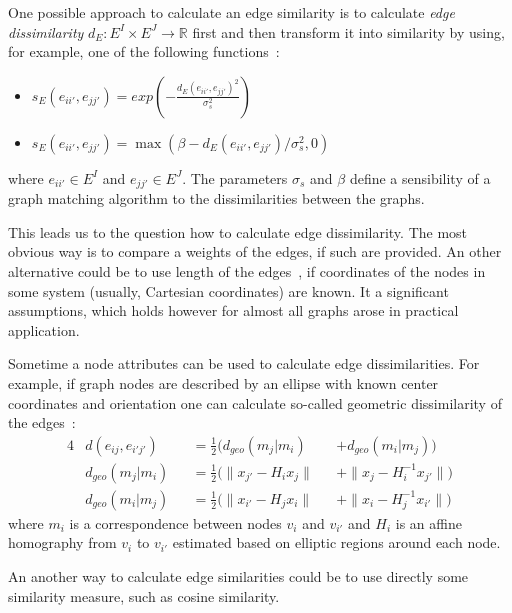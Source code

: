 One possible approach to calculate an edge similarity is to calculate \emph{edge dissimilarity} $d_E:E^I\times E^J\rightarrow\mathbb{R}$ first and then transform it into similarity by using, for example, one of the following functions~\cite{Cho2014_Haystack, Cho2009_AgglClustering, Cho2010_RRWM,Cho2012_ProgressiveGM}:
\begin{itemize}
	\item $s_E(e_{ii\prime}, e_{jj\prime})= exp(-\frac{d_E(e_{ii\prime}, e_{jj\prime})^2}{\sigma^2_{s}})$
	\item $s_E(e_{ii\prime}, e_{jj\prime})= \max(\beta - d_E(e_{ii\prime}, e_{jj\prime})/\sigma^2_{s},0)$
\end{itemize}
where $e_{ii\prime}\in E^I$ and $e_{jj\prime}\in E^J$. The parameters $\sigma_s$ and $\beta$ define a sensibility of a graph matching algorithm to the dissimilarities between the graphs.

This leads us to the question how to calculate edge dissimilarity. The most obvious way is to compare a weights of the edges, if such are provided. An other alternative could be to use length of the edges~\cite{Cho2014_Haystack, Cho2009_AgglClustering, Cho2010_RRWM,Cho2012_ProgressiveGM}, if coordinates of the nodes in some system (usually, Cartesian coordinates) are known. It a significant assumptions, which holds however for almost all graphs arose in practical application.

Sometime a node attributes can be used to calculate edge dissimilarities. For example, if graph nodes are described by an ellipse with known center coordinates and orientation one can calculate so-called geometric dissimilarity of the edges~\cite{Cho2009_AgglClustering,Cho2012_ProgressiveGM}:
\begin{alignat}{4}\label{eq:geomDiss}
& d(e_{ij},e_{i'j'}) && =\frac{1}{2}(d_{geo}(m_j|m_i) && +d_{geo}(m_i|m_j)) \\
& d_{geo}(m_j|m_i) && =\frac{1}{2}(\|x_{j'}-H_{i}x_j\| && + \|x_{j}-H^{-1}_ix_{j'}\|) \\
& d_{geo}(m_i|m_j) && =\frac{1}{2}(\|x_{i'}-H_{j}x_i\| && + \|x_{i}-H^{-1}_{j}x_{i'}\|) 
\end{alignat}
where $m_i$ is a correspondence between nodes $v_i$ and $v_{i'}$ and $H_i$ is an affine homography from $v_i$ to $v_{i'}$ estimated based on elliptic regions around each node.

An another way to calculate edge similarities could be to use directly some similarity measure, such as cosine similarity.

